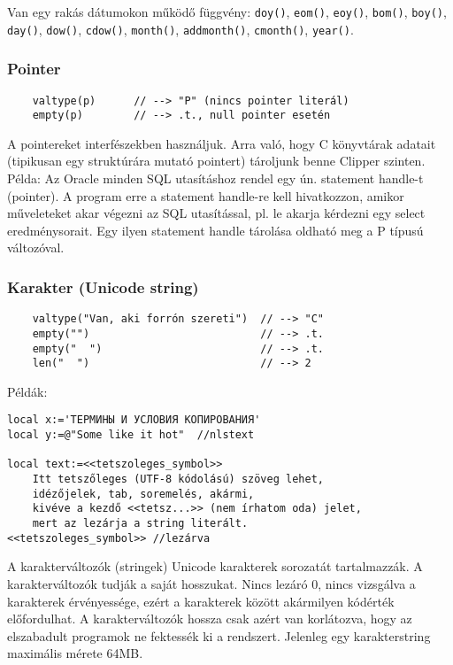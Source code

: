Van egy rakás dátumokon működő függvény:
\verb!doy()!,
\verb!eom()!,
\verb!eoy()!,
\verb!bom()!,
\verb!boy()!,
\verb!day()!,
\verb!dow()!,
\verb!cdow()!,
\verb!month()!,
\verb!addmonth()!,
\verb!cmonth()!,
\verb!year()!.


\subsubsection{Pointer}

\begin{verbatim}
    valtype(p)      // --> "P" (nincs pointer literál)
    empty(p)        // --> .t., null pointer esetén
\end{verbatim}

A pointereket interfészekben használjuk. Arra való, hogy C könyvtárak
adatait (tipikusan egy struktúrára mutató pointert) tároljunk benne Clipper szinten.
Példa: Az Oracle minden SQL utasításhoz rendel egy ún. statement handle-t (pointer).
A program erre a statement handle-re kell hivatkozzon, amikor műveleteket
akar végezni az SQL utasítással, pl.  le akarja kérdezni egy select
eredménysorait. Egy ilyen statement handle tárolása oldható meg a P típusú
változóval.


\subsubsection{Karakter (Unicode string)}
\begin{verbatim}
    valtype("Van, aki forrón szereti")  // --> "C"
    empty("")                           // --> .t.
    empty("  ")                         // --> .t.
    len("  ")                           // --> 2
\end{verbatim}

Példák:
\begin{verbatim}
local x:='ТЕРМИНЫ И УСЛОВИЯ КОПИРОВАНИЯ'
local y:=@"Some like it hot"  //nlstext

local text:=<<tetszoleges_symbol>>
    Itt tetszőleges (UTF-8 kódolású) szöveg lehet,
    idézőjelek, tab, soremelés, akármi,
    kivéve a kezdő <<tetsz...>> (nem írhatom oda) jelet,
    mert az lezárja a string literált.
<<tetszoleges_symbol>> //lezárva
\end{verbatim}


A karakterváltozók (stringek) Unicode karakterek sorozatát tartalmazzák.
A karakterváltozók tudják a saját hosszukat. Nincs lezáró 0, nincs vizsgálva 
a karakterek érvényessége, ezért a karakterek között akármilyen kódérték 
előfordulhat. A karakterváltozók hossza csak azért van korlátozva, hogy az 
elszabadult programok ne fektessék ki a rendszert. Jelenleg egy karakterstring 
maximális mérete 64MB. 

